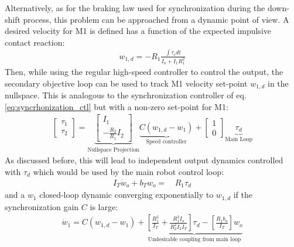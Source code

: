 %
Alternatively, as for the braking law used for synchronization during the down-shift process, this problem can be approached from a dynamic point of view. A desired velocity for M1 is defined has a function of the expected impulsive contact reaction:
%
\begin{align}
w_{1,d}  = - R_1 \frac{\int{\tau_c dt}}{I_o + I_1 R_1^2}
\label{eq:dsdm_impact_gen_delta_w1}
\end{align}
%
Then, while using the regular high-speed controller to control the output, the secondary objective loop can be used to track M1 velocity set-point $w_{1,d}$ in the nullspace. This is analogous to the synchronization controller of eq. \eqref{eq:syncrhonization_ctl} but with a non-zero set-point for M1:
%
\begin{align}
\left[ \begin{array}{c}
\tau_1 \\
\tau_2
\end{array} \right]
 = 
\underbrace{\left[ \begin{array}{c}
I_1 \\
-\frac{R_2 }{R_1} I_2 
\end{array} \right]}_{\text{Nullspace Projection}} \underbrace{C (w_{1,d} -  w_1)}_{\text{Speed controller}} + 
\left[ \begin{array}{c}
1 \\
0 
\end{array} \right]  \underbrace{ \tau_d }_{\text{Main Loop}}
\end{align}
%
As discussed before, this will lead to independent output dynamics controlled with $\tau_d$ which would be used by the main robot control loop:
\begin{align}
I_T \dot{w}_o +
b_T  w_o
=& \, R_1 \tau_d  
\end{align}
and a $w_1$ closed-loop dynamic converging exponentially to $w_{1,d}$ if the synchronization gain $C$ is large:
\begin{align}
 \dot{w}_1 = C \left( w_{1,d} - w_1 \right) + \underbrace{\left[\frac{R_1^2}{I_T} + \frac{R_1^2 I_o}{R_2^2 I_2 I_T} \right] \tau_d - \left[\frac{R_1 b_o}{I_T}\right] w_o }_{\text{Undesirable coupling from main loop}}
\end{align}

